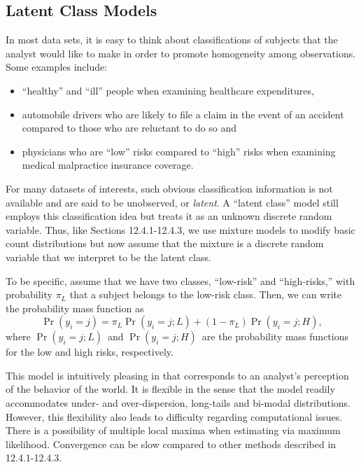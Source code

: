 {\linejed

\subsection{Latent Class Models}

In most data sets, it is easy to think about classifications of subjects
that the analyst would like to make in order to promote homogeneity among
observations. Some examples include:

\begin{itemize}
\item ``healthy'' and ``ill'' people when examining healthcare expenditures,

\item automobile drivers who are likely to file a claim in the event of an
accident compared to those who are reluctant to do so and

\item physicians who are ``low'' risks
compared to ``high'' risks when examining medical malpractice
insurance coverage.
\end{itemize}

For many datasets of interests, such obvious classification
information is not available and are said to be unobserved, or
\emph{latent}. A ``latent class'' model still employs this
classification idea but treats it as an unknown discrete random
variable. Thus, like Sections 12.4.1-12.4.3, we use mixture models
to modify basic count distributions but now assume that the mixture
is a discrete random variable that we interpret to be the latent
class.

To be specific, assume that we have two classes, ``low-risk'' and
``high-risks,'' with probability $\pi_{L}$ that a subject belongs to
the low-risk class. Then, we can write the probability mass
function as%
\begin{equation}\label{E12:Latent}
\Pr \left( y_i=j\right) =\pi_{L}\Pr \left( y_i=j;L\right) +\left(
1-\pi_{L}\right) \Pr \left( y_i=j;H\right) ,
\end{equation}%
where $\Pr \left( y_i=j;L\right) $\ and $\Pr \left( y_i=j;H\right)
$\ are the probability mass functions for the low and high risks,
respectively.

This model is intuitively pleasing in that corresponds to an
analyst's perception of the behavior of the world. It is flexible in
the sense that the model readily accommodates under- and
over-dispersion, long-tails and bi-modal distributions. However,
this flexibility also leads to difficulty regarding computational
issues. There is a possibility of multiple local maxima when
estimating via maximum likelihood. Convergence can be slow compared
to other methods described in 12.4.1-12.4.3.

}

